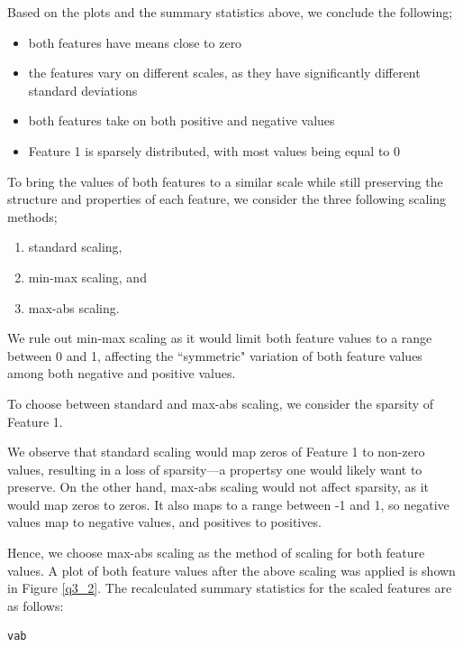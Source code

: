 \documentclass{article}[a4paper]
\begin{document}
	Based on the plots and the summary statistics above, we conclude the following;
	\begin{itemize}
		\item both features have means close to zero
		\item the features vary on different scales, as they have significantly different standard deviations
		\item both features take on both positive and negative values
		\item Feature 1 is sparsely distributed, with most values being equal to 0
	\end{itemize}

	To bring the values of both features to a similar scale while still preserving the structure and properties of
	each feature, we consider the three following scaling methods;
	\begin{enumerate}
		\item standard scaling,
		\item min-max scaling, and
		\item max-abs scaling.
	\end{enumerate}
	
	We rule out min-max scaling as it would limit both feature values to a range between 0 and 1, affecting the 
	``symmetric" variation of both feature values among both negative and positive values.
	\newline

	To choose between standard and max-abs scaling, we consider the sparsity of Feature 1.
	\newline
	
	We observe that standard scaling would map zeros of Feature 1 to non-zero values, resulting in a loss of sparsity---a propertsy
	one would likely want to preserve. On the other hand, max-abs scaling would not affect sparsity, as it would map zeros to zeros.
	It also maps to a range between -1 and 1, so negative values map to negative values, and positives to positives.
	\newline

	Hence, we choose max-abs scaling as the method of scaling for both feature values. A plot of both feature values after the above
	scaling was applied is shown in Figure \ref{q3_2}. The recalculated summary statistics for the scaled features are as follows:
	\begin{verbatim}
vab
	\end{verbatim}
\end{document}
